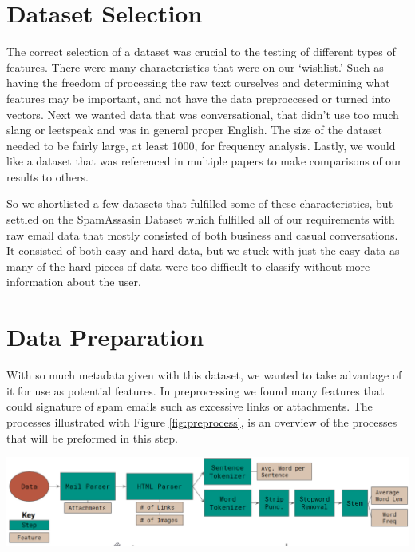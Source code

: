 \documentclass[12pt]{article}
\newenvironment{Figure}
  {\par\medskip\noindent\minipage{\linewidth}}
  {\endminipage\par\medskip}
\begin{document}
\begin{multicols}{2}
        \section{Dataset Selection}
            The correct selection of a dataset was crucial to the testing of 
            different types of features. There were many characteristics that were
            on our `wishlist.' Such as having the freedom of processing 
            the raw text ourselves and determining what features may be important, 
            and not have the data preproccesed or turned into vectors.
            Next we wanted data that was conversational, that didn't use too much 
            slang or leetspeak and was in general proper English. The size of the
            dataset needed to be fairly large, at least 1000, for frequency analysis.
            Lastly, we would like a dataset that was referenced in multiple papers to make comparisons
            of our results to others. 
            
            So we shortlisted a few datasets that fulfilled some of these characteristics, but
            settled on the SpamAssasin Dataset which fulfilled all of our requirements
            with raw email data that mostly consisted of both business and casual
            conversations\cite{sa_dataset}. It consisted of both easy and hard data, but we stuck with
            just the easy data as many of the hard pieces of data were too difficult
            to classify without more information about the user.

        \section{Data Preparation}
            
            With so much metadata given with this dataset, we wanted to take advantage
            of it for use as potential features. In preprocessing we found many features
            that could signature of spam emails such as excessive links or attachments.
            The processes illustrated with Figure \ref{fig:preprocess}, is an overview
            of the processes that will be preformed in this step.


            \begin{Figure}
                \centering
                \includegraphics[width=\linewidth]{figures/prep.png}
                \label{fig:preprocess}
            \end{Figure}



\end{multicols}
\end{document}
